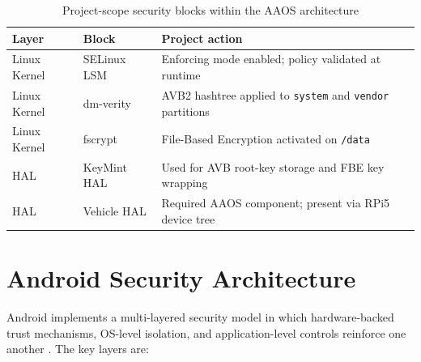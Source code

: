 \begin{table}[h]
\centering
\caption{Project-scope security blocks within the AAOS architecture}
\label{tab:arch_scope}
\begin{tabular}{llp{6.5cm}}
\toprule
\textbf{Layer} & \textbf{Block} & \textbf{Project action} \\
\midrule
Linux Kernel & SELinux LSM      & Enforcing mode enabled; policy validated at runtime \\
Linux Kernel & dm-verity        & AVB2 hashtree applied to \texttt{system} and \texttt{vendor} partitions \\
Linux Kernel & fscrypt          & File-Based Encryption activated on \texttt{/data} \\
HAL          & KeyMint HAL      & Used for AVB root-key storage and FBE key wrapping \\
HAL          & Vehicle HAL      & Required AAOS component; present via RPi5 device tree \\
\bottomrule
\end{tabular}
\end{table}

\section{Android Security Architecture}
\label{sec:bg_android_security}

Android implements a multi-layered security model in which hardware-backed trust mechanisms, OS-level isolation, and application-level controls reinforce one another \cite{android_security_features}. The key layers are:

